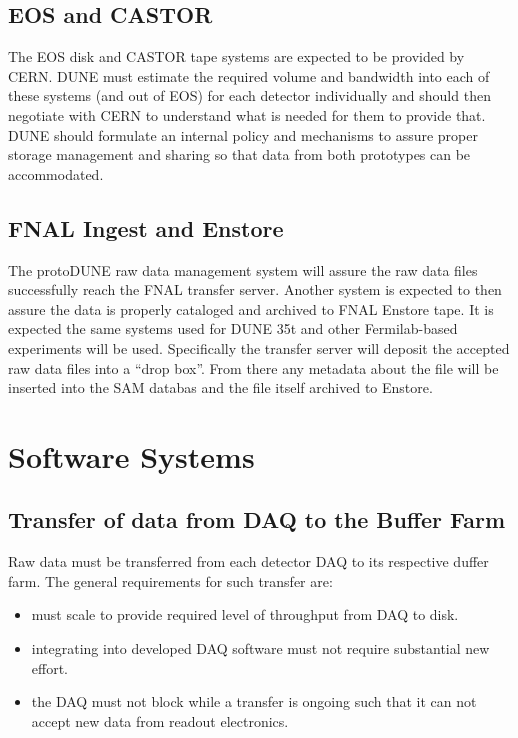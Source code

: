 \documentclass[pdftex,12pt,letter]{article}
\begin{document}

\subsection{EOS and CASTOR}

The EOS disk and CASTOR tape systems are expected to be provided by
CERN.  DUNE must estimate the required volume and bandwidth into each
of these systems (and out of EOS) for each detector individually and
should then negotiate with CERN to understand what is needed for them
to provide that.  DUNE should formulate an internal policy and
mechanisms to assure proper storage management and sharing so that
data from both prototypes can be accommodated.

\subsection{FNAL Ingest and Enstore}

The protoDUNE raw data management system will assure the raw data
files successfully reach the FNAL transfer server.  Another system
is expected to then assure the data is properly cataloged and archived
to FNAL Enstore tape.  It is expected the same systems used for DUNE
35t and other Fermilab-based experiments will be used.  Specifically
the transfer server will deposit the accepted raw data files into a
``drop box''.  From there any metadata about the file will be inserted
into the SAM databas and the file itself archived to Enstore.

\section{Software Systems}

\subsection{Transfer of data from DAQ to the Buffer Farm}

Raw data must be transferred from each detector DAQ to its respective
duffer farm.  The general requirements for such transfer are:

\begin{itemize}
\item must scale to provide required level of throughput from DAQ to disk.
\item integrating into developed DAQ software must not require
  substantial new effort.
\item the DAQ must not block while a transfer is ongoing such that it
  can not accept new data from readout electronics.
\end{itemize}
\end{document}
